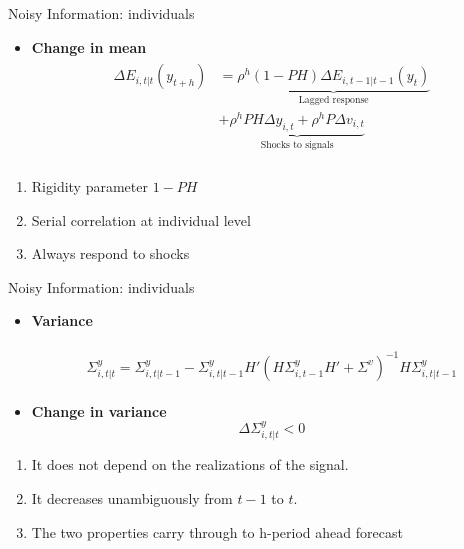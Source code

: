 \documentclass{beamer}
\begin{document}
\begin{frame}{Noisy Information: individuals}
\begin{itemize}
\item \textbf{Change in mean}
\begin{eqnarray*}
	\begin{aligned}
		\Delta E_{i,t|t}(y_{t+h}) & = \underbrace{\rho^h (1-PH)\Delta E_{i,t-1|t-1}(y_{t})}_{\text{Lagged response}} \\
		& + \underbrace{\rho^hPH \Delta y_{i,t} + \rho^h P\Delta v_{i,t}}_{\text{Shocks to signals}}\\
	\end{aligned}
\end{eqnarray*}
\end{itemize}

\begin{enumerate}
	\item Rigidity parameter $1-PH$
	\item Serial correlation at individual level 
	\item Always respond to shocks 
\end{enumerate}

\end{frame}

\begin{frame}{Noisy Information: individuals}
\begin{itemize}
	\item \textbf{Variance}
	
	\begin{eqnarray*}
		\begin{aligned}
			\Sigma^y_{i,t|t} = \Sigma^y_{i,t|t-1} - \Sigma^y_{i,t|t-1} H'(H \Sigma^y_{i,t-1} H' +\Sigma^v) ^{-1}H \Sigma^y_{i,t|t-1} 
		\end{aligned}
	\end{eqnarray*}
	\item \textbf{Change in variance} 
	$$\Delta \Sigma^y_{i,t|t} <0$$
	
\end{itemize}
\begin{enumerate}
	\item It does not depend on the realizations of the signal. 
	\item It decreases unambiguously from $t-1$ to $t$. 
	\item The two properties carry through to h-period ahead forecast 
\end{enumerate}

\end{frame}
\end{document}
